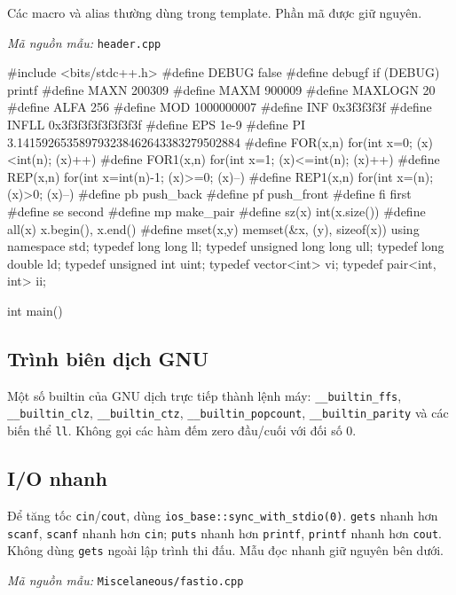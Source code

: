 \documentclass[11pt]{article}
\newcommand{\codepath}[1]{\par\noindent\textit{Mã nguồn mẫu:} \texttt{#1}\par}
\begin{document}
Các macro và alias thường dùng trong template. Phần mã được giữ nguyên.

\codepath{header.cpp}

\begingroup\scriptsize
\begin{vncode}
#include <bits/stdc++.h>
#define DEBUG false
#define debugf if (DEBUG) printf
#define MAXN 200309
#define MAXM 900009
#define MAXLOGN 20
#define ALFA 256
#define MOD 1000000007
#define INF 0x3f3f3f3f
#define INFLL 0x3f3f3f3f3f3f3f3f
#define EPS 1e-9
#define PI 3.141592653589793238462643383279502884
#define FOR(x,n) for(int x=0; (x)<int(n); (x)++)
#define FOR1(x,n) for(int x=1; (x)<=int(n); (x)++)
#define REP(x,n) for(int x=int(n)-1; (x)>=0; (x)--)
#define REP1(x,n) for(int x=(n); (x)>0; (x)--)
#define pb push_back
#define pf push_front
#define fi first
#define se second
#define mp make_pair
#define sz(x) int(x.size())
#define all(x) x.begin(), x.end()
#define mset(x,y) memset(&x, (y), sizeof(x))
using namespace std;
typedef long long ll;
typedef unsigned long long ull;
typedef long double ld;
typedef unsigned int uint;
typedef vector<int> vi;
typedef pair<int, int> ii;

int main() {}
\end{vncode}
\endgroup


\subsection{Trình biên dịch GNU}

Một số builtin của GNU dịch trực tiếp thành lệnh máy: \texttt{\_\_builtin\_ffs}, \texttt{\_\_builtin\_clz}, \texttt{\_\_builtin\_ctz}, \texttt{\_\_builtin\_popcount}, \texttt{\_\_builtin\_parity} và các biến thể \texttt{ll}. Không gọi các hàm đếm zero đầu/cuối với đối số 0.

\subsection{I/O nhanh}

Để tăng tốc \texttt{cin}/\texttt{cout}, dùng \texttt{ios\_base::sync\_with\_stdio(0)}. \texttt{gets} nhanh hơn \texttt{scanf}, \texttt{scanf} nhanh hơn \texttt{cin}; \texttt{puts} nhanh hơn \texttt{printf}, \texttt{printf} nhanh hơn \texttt{cout}. Không dùng \texttt{gets} ngoài lập trình thi đấu. Mẫu đọc nhanh giữ nguyên bên dưới.

\codepath{Miscelaneous/fastio.cpp}
\end{document}
